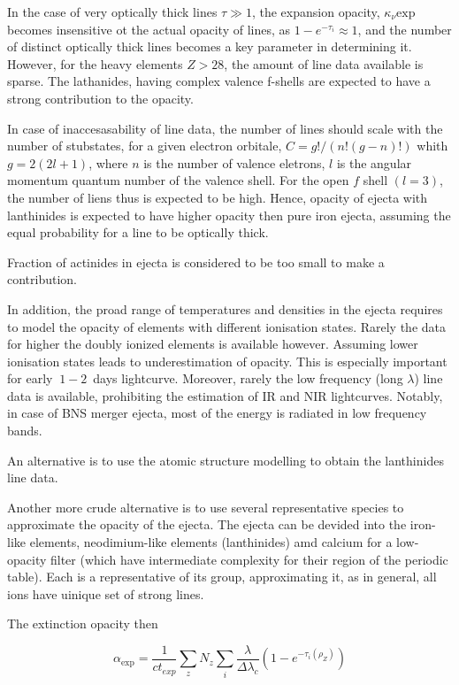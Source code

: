 \documentclass[11pt,a4paper,headinclude=true,DIV=14,BCOR=8mm,chapterprefix,listof=totoc,twoside,openright,abstracton]{scrbook}
\begin{document}
In the case of very optically thick lines $\tau\gg 1$, the expansion opacity, $\kappa_{\nu}\text{exp}$ becomes insensitive ot the actual opacity of lines, as $1-e^{-\tau_i}\approx 1$, and the number of distinct optically thick lines becomes a key parameter in determining it. However, for the heavy elements $Z>28$, the amount of line data available is sparse. The lathanides, having complex valence f-shells are expected to have a strong contribution to the opacity. 

In case of inaccesasability of line data, the number of lines should scale with the number of stubstates, for a given electron orbitale, $C=g! / (n! (g-n)!)$ whith $g=2(2l+1)$, where $n$ is the number of valence eletrons, $l$ is the angular momentum quantum number of the valence shell. For the open $f$ shell $(l=3)$, the number of liens thus is expected to be high. Hence, opacity of ejecta with lanthinides is expected to have higher opacity then pure iron ejecta, assuming the equal probability for a line to be optically thick. 

Fraction of actinides in ejecta is considered to be too small to make a contribution.

In addition, the proad range of temperatures and densities in the ejecta requires to model the opacity of elements with different ionisation states. Rarely the data for higher the doubly ionized elements is available however. Assuming lower ionisation states leads to underestimation of opacity. This is especially important for early $~1-2$~days lightcurve. Moreover, rarely the low frequency (long $\lambda$) line data is available, prohibiting the estimation of IR and NIR lightcurves. Notably, in case of BNS merger ejecta, most of the energy is radiated in low frequency bands. 

An alternative is to use the atomic structure modelling to obtain the lanthinides line data.

Another more crude alternative is to use several representative species to approximate the opacity of the ejecta. The ejecta can be devided into the iron-like elements, neodimium-like elements (lanthinides) amd calcium for a low-opacity filter (which have intermediate complexity for their region of the periodic table). Each is a representative of its group, approximating it, as in general, all ions have uinique set of strong lines. 

The extinction opacity then 

\begin{equation}
    \alpha_{\text{exp}} = \frac{1}{ct_{exp}} \sum_z N_z \sum_i \frac{\lambda}{\Delta \lambda_c} (1 - e^{-\tau_i(\rho_Z)})
\end{equation}
\end{document}
